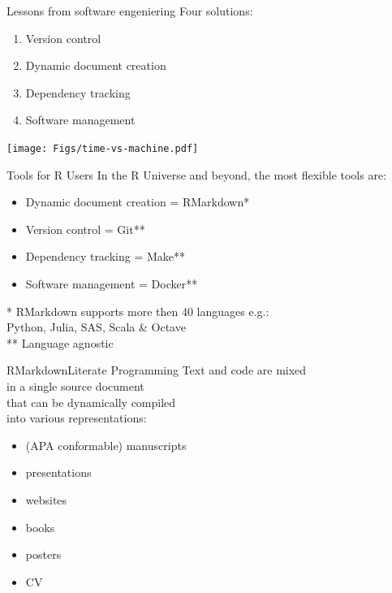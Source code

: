 \documentclass[12pt,t]{beamer}
\begin{document}
{\begin{frame}[c]{Lessons from software engeniering}
Four solutions:
  \begin{enumerate}
    \item \textcolor{vhilit}{Version control}
    \item \textcolor{vhilit}{Dynamic document creation}
    \item \textcolor{hilit}{Dependency tracking}
    \item \textcolor{hilit}{Software management}
  \end{enumerate}
  \hfill \texttt{[image: Figs/time-vs-machine.pdf]}

\end{frame}

\begin{frame}[c]{Tools for R Users}
	In the R Universe and beyond, the most flexible tools are:
  \begin{itemize}
    \item Dynamic document creation = RMarkdown*
    \item Version control = Git**
    \item Dependency tracking = Make**
    \item Software management = Docker**
  \end{itemize}
  \vfill
  \textcolor{lolit}{
	* RMarkdown supports more then 40 languages e.g.:\\
	\hspace{10mm}Python, Julia, SAS, Scala \& Octave\\
	** Language agnostic
	}
\end{frame}

\begin{frame}[c]{RMarkdown\textemdash{}Literate Programming}
  Text and code are mixed\\
  in a single source document\\
  that can be \textcolor{hilit}{dynamically} compiled\\
  into various representations:
  \begin{itemize}
    \item (APA conformable) manuscripts
    \item presentations
    \item websites
    \item books
    \item posters
		\item CV
  \end{itemize}
\end{frame}

}
\end{document}
